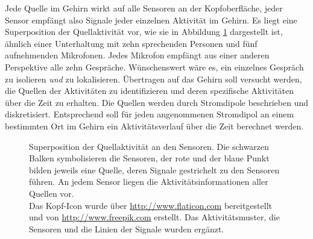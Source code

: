\documentclass[doc,a4paper,12pt]{apa6}
\begin{document}
Jede Quelle im Gehirn wirkt auf alle Sensoren an der Kopfoberfläche, jeder Sensor empfängt also Signale jeder einzelnen Aktivität im Gehirn. Es liegt eine Superposition der Quellaktivität vor, wie sie in Abbildung \ref{img:superposition} dargestellt ist, ähnlich einer Unterhaltung mit zehn sprechenden Personen und fünf aufnehmenden Mikrofonen. Jedes Mikrofon empfängt aus einer anderen Perspektive alle zehn Gespräche. Wünschenswert wäre es, ein einzelnes Gespräch zu isolieren \emph{und} zu lokalisieren. Übertragen auf das Gehirn soll versucht werden, die Quellen der Aktivitäten zu identifizieren und deren spezifische Aktivitäten über die Zeit zu erhalten. Die Quellen werden durch Stromdipole beschrieben und diskretisiert. Entsprechend soll für jeden angenommenen Stromdipol an einem bestimmten Ort im Gehirn ein Aktivitätsverlauf über die Zeit berechnet werden.

\begin{figure}
  \centering
    \setlength{\fboxsep}{8mm}
  \vspace*{3mm}
  \caption[Superposition der Quellaktivität an den Sensoren]{Superposition der Quellaktivität an den Sensoren. Die schwarzen Balken symbolisieren die Sensoren, der rote und der blaue Punkt bilden jeweils eine Quelle, deren Signale gestrichelt zu den Sensoren führen. An jedem Sensor liegen die Aktivitätsinformationen aller Quellen vor.\\ Das Kopf-Icon wurde über \url{http://www.flaticon.com} bereitgestellt und von \url{http://www.freepik.com} erstellt. Das Aktivitätsmuster, die Sensoren und die Linien der Signale wurden ergänzt.}
  \label{img:superposition}
\end{figure}
\end{document}

